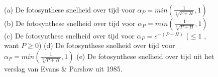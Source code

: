 \begin{figure} [H]
    \centering
    \\
    \caption{  
    (a) De fotosynthese snelheid over tijd voor $\alpha_P=min(\frac{1}{\sqrt[4]{P+H}},1)$  
    (b) De fotosynthese snelheid over tijd voor $\alpha_P=min(\frac{1}{\sqrt[2]{P+H}},1)$  
    (c) De fotosynthese snelheid over tijd voor $\alpha_P=e^{-(P+H)}$ ($\leq 1$ , want $P \geq 0 $)  
    (d) De fotosynthese snelheid over tijd voor $\alpha_P=min(\frac{1}{\sqrt[3]{P+H}},1)$  
    (e) De fotosynthese snelheid over tijd uit het verslag van Evans \& Parslow uit 1985.}
    \label{fig:alphavergelijking}
\end{figure}
